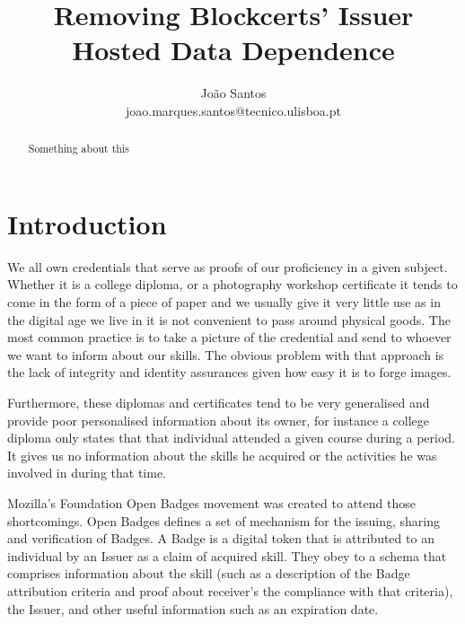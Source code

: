 \documentclass[llncsdoc]{llncs}
\begin{document}
\pagestyle{plain}
\makeatletter
\renewcommand\subsubsection{\@startsection{subsubsection}{2}{\z@}%
	{-18\p@ \@plus -4\p@ \@minus -4\p@}%
	{8\p@ \@plus 4\p@ \@minus 4\p@}%
	{\normalfont\normalsize\bfseries\boldmath
		\rightskip=\z@ \@plus 8em\pretolerance=10000 }}
\DeclareRobustCommand{\rchi}{{\mathpalette\irchi\relax}}
\newcommand{\irchi}[2]{\raisebox{\depth}{$#1\chi$}}
		
\title{Removing Blockcerts' Issuer Hosted Data Dependence}


\author{João Santos\\joao.marques.santos@tecnico.ulisboa.pt}
\maketitle
\thispagestyle{plain}


\begin{abstract}

  Something about this
\end{abstract}

\section{Introduction}
We all own credentials that serve as proofs of our proficiency in a given subject. Whether it is a college diploma, or a photography workshop certificate it tends to come in the form of a piece of paper and we usually give it very little use as in the digital age we live in it is not convenient to pass around physical goods. The most common practice is to take a picture of the credential and send to whoever we want to inform about our skills. The obvious problem with that approach is the lack of integrity and identity assurances given how easy it is to forge images.

Furthermore, these diplomas and certificates tend to be very generalised and provide poor personalised information about its owner, for instance a college diploma only states that that individual attended a given course during a period. It gives us no information about the skills he acquired or the activities he was involved in during that time.

Mozilla's Foundation Open Badges movement was created to attend those shortcomings. Open Badges defines a set of mechanism for the issuing, sharing and verification of Badges. A Badge is a digital token that is attributed to an individual by an Issuer as a claim of acquired skill. They obey to a schema that comprises information about the skill (such as a description of the Badge attribution criteria and proof about receiver's the compliance with that criteria), the Issuer, and other useful information such as an expiration date. 
\end{document}
